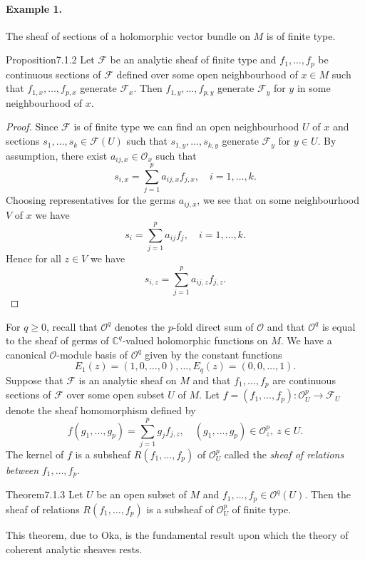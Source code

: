 \paragraph{Example 1.} The sheaf of sections of a holomorphic vector bundle on $M$ is of finite type.
\begin{originaltheorem}{Proposition}{7.1.2}
Let $\mathcal{F}$ be an analytic sheaf of finite type and $f_1,\ldots,f_p$ be continuous sections of $\mathcal{F}$ defined over some open neighbourhood of $x\in M$ such that $f_{1,x},\ldots,f_{p,x}$ generate $\mathcal{F}_x$. Then $f_{1,y},\ldots,f_{p,y}$ generate $\mathcal{F}_y$ for $y$ in some neighbourhood of $x$.
\end{originaltheorem}
\begin{proof}
Since $\mathcal{F}$ is of finite type we can find an open neighbourhood $U$ of $x$ and sections $s_1,\ldots,s_k\in\mathcal{F}(U)$ such that $s_{1,y},\ldots,s_{k,y}$ generate $\mathcal{F}_y$ for $y\in U$. By assumption, there exist $a_{ij,x}\in\mathcal{O}_x$ such that
\[
s_{i,x}=\sum_{j=1}^p a_{ij,x}f_{j,x},\quad i=1,\ldots,k.
\]
Choosing representatives for the germs $a_{ij,x}$, we see that on some neighbourhood $V$ of $x$ we have
\[
s_i=\sum_{j=1}^p a_{ij}f_j,\quad i=1,\ldots,k.
\]
Hence for all $z\in V$ we have
\[
s_{i,z}=\sum_{j=1}^p a_{ij,z}f_{j,z}.
\]
\end{proof}
For $q\geq0$, recall that $\mathcal{O}^q$ denotes the $p$-fold direct sum of $\mathcal{O}$ and that $\mathcal{O}^q$ is equal to the sheaf of germs of $\mathbb{C}^q$-valued holomorphic functions on $M$. We have a canonical $\mathcal{O}$-module basis of $\mathcal{O}^q$ given by the constant functions
\[
E_1(z)=(1,0,\ldots,0),\ldots,E_q(z)=(0,0,\ldots,1).
\]
Suppose that $\mathcal{F}$ is an analytic sheaf on $M$ and that $f_1,\ldots,f_p$ are continuous sections of $\mathcal{F}$ over some open subset $U$ of $M$. Let $f=(f_1,\ldots,f_p):\mathcal{O}_U^p\to\mathcal{F}_U$ denote the sheaf homomorphism defined by
\[
f(g_1,\ldots,g_p)=\sum_{j=1}^p g_jf_{j,z},\quad (g_1,\ldots,g_p)\in\mathcal{O}_z^p,\ z\in U.
\]
The kernel of $f$ is a subsheaf $R(f_1,\ldots,f_p)$ of $\mathcal{O}_U^p$ called the \emph{sheaf of relations between} $f_1,\ldots,f_p$.
\begin{originaltheorem}{Theorem}{7.1.3}
Let $U$ be an open subset of $M$ and $f_1,\ldots,f_p\in\mathcal{O}^q(U)$. Then the sheaf of relations $R(f_1,\ldots,f_p)$ is a subsheaf of $\mathcal{O}_U^p$ of finite type.
\end{originaltheorem}
This theorem, due to Oka, is the fundamental result upon which the theory of coherent analytic sheaves rests.

